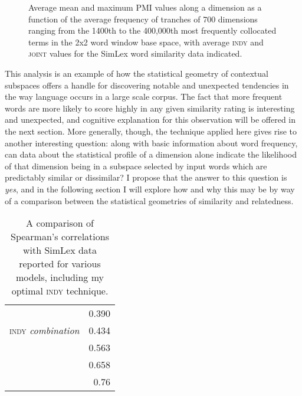 \begin{figure}
\caption{Average mean and maximum PMI values along a dimension as a function of the average frequency of tranches of 700 dimensions ranging from the 1400th to the 400,000th most frequently collocated terms in the 2x2 word window base space, with average \textsc{indy} and \textsc{joint} values for the SimLex word similarity data indicated.}
\label{fig:meanmax}
\end{figure}

This analysis is an example of how the statistical geometry of contextual subspaces offers a handle for discovering notable and unexpected tendencies in the way language occurs in a large scale corpus.  The fact that more frequent words are more likely to score highly in any given similarity rating is interesting and unexpected, and cognitive explanation for this observation will be offered in the next section.  More generally, though, the technique applied here gives rise to another interesting question: along with basic information about word frequency, can data about the statistical profile of a dimension alone indicate the likelihood of that dimension being in a subspace selected by input words which are predictably similar or dissimilar?  I propose that the answer to this question is \emph{yes}, and in the following section I will explore how and why this may be by way of a comparison between the statistical geometries of similarity and relatedness.

\begin{table}
\centering
\begin{tabular}{lr}
\hline
\cite{MaEA2017} & 0.390 \\
\textsc{indy} \emph{combination} & 0.434 \\
\cite{SchwartzEA2015} & 0.563 \\
\cite{BanjadeEA2015} & 0.658 \\
\cite{RecskiEA2016} & 0.76 \\
\hline
\end{tabular}
\caption{A comparison of Spearman's correlations with SimLex data reported for various models, including my optimal \textsc{indy} technique.}
\label{tab:simpare}
\end{table}

